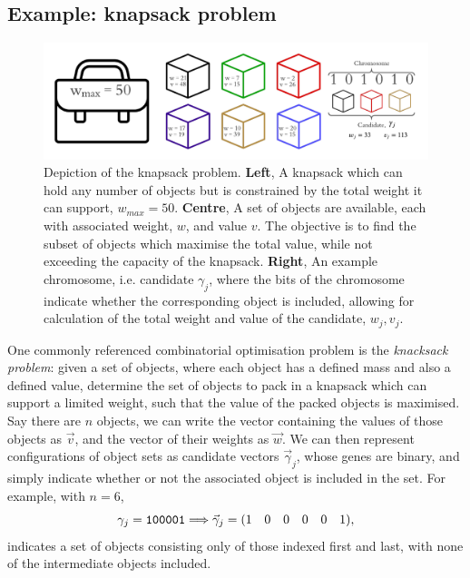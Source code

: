 \subsection{Example: knapsack problem}\label{sec:knapsack}
\begin{figure}
    \begin{center}
        \includegraphics[width=\textwidth]{theoretical_study/figures/knapsack_schematic.pdf}
    \end{center}
    \caption[Knapsack problem]{
        Depiction of the knapsack problem.
        \textbf{Left}, A knapsack which can hold any number of objects but is constrained by the total weight it can support, 
        $w_{max} = 50$. 
        \textbf{Centre}, A set of objects are available, each with associated weight, $w$, and value $v$. 
        The objective is to find the subset of objects which maximise the total value, 
        while not exceeding the capacity of the knapsack. 
        \textbf{Right}, An example chromosome, i.e. candidate $\gamma_j$, where the bits of the chromosome indicate 
            whether the corresponding object is included, allowing for calculation of the total weight and value of 
            the candidate, $w_{j}, v_{j}$. 
    }

\end{figure}
One commonly referenced combinatorial optimisation problem is the \emph{knacksack problem}: 
    given a set of objects, where each object has a defined mass and also a defined value, 
    determine the set of objects to pack in a knapsack which can support a limited weight, 
    such that the value of the packed objects is maximised. 
Say there are $n$ objects, 
    we can write the vector containing the values of those objects as $\vec{v}$, 
    and the vector of their weights as $\vec{w}$. 
We can then represent configurations of object sets as candidate vectors $\vec{\gamma}_j$, 
    whose genes are binary, and simply indicate whether or not the associated object is included in the set. 
For example, with $n=6$,
\begin{equation}
    \gamma_j = \texttt{100001} \Longrightarrow \vec{\gamma}_j = \begin{matrix}(1 & 0 & 0 & 0 & 0 & 1)\end{matrix},
\end{equation} 
indicates a set of objects consisting only of those indexed first and last, with none of the intermediate objects included. 

